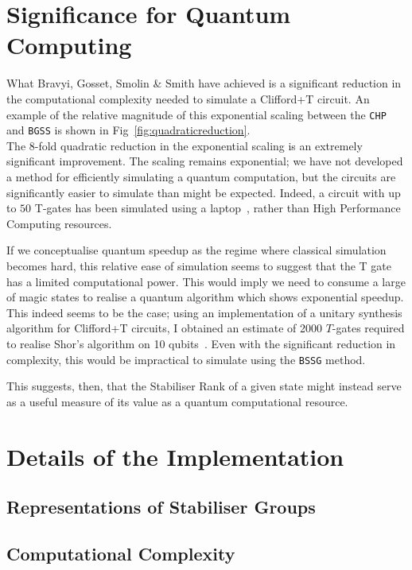 \documentclass{standalone}
\begin{document}
\section{Significance for Quantum Computing}\label{sec:whybgss}
What Bravyi, Gosset, Smolin \& Smith have achieved is a significant reduction in the computational complexity needed to simulate a Clifford+T circuit. An example of the relative magnitude of this exponential scaling between the \texttt{CHP} and \texttt{BGSS} is shown in Fig~\ref{fig:quadraticreduction}. \\
The 8-fold quadratic reduction in the exponential scaling is an extremely significant improvement. The scaling remains exponential; we have not developed a method for efficiently simulating a quantum computation, but the circuits are significantly easier to simulate than might be expected. Indeed, a circuit with up to $50$ T-gates has been simulated using a laptop~\cite{Bravyi2015}, rather than High Performance Computing resources. 
\par
If we conceptualise quantum speedup as the regime where classical simulation becomes hard, this relative ease of simulation seems to suggest that the T gate has a limited computational power. This would imply we need to consume a large of magic states to realise a quantum algorithm which shows exponential speedup.\\
This indeed seems to be the case; using an implementation of a unitary synthesis algorithm for Clifford+T circuits, I obtained an estimate of 2000 $T$-gates required to realise Shor's algorithm on 10 qubits~\cite{Selinger2012}. Even with the significant reduction in complexity, this would be impractical to simulate using the \texttt{BSSG} method. 
\par
This suggests, then, that the Stabiliser Rank of a given state might instead serve as a useful measure of its value as a quantum computational resource. 

\section{Details of the Implementation}
\subsection{Representations of Stabiliser Groups}
\subsection{Computational Complexity}
\ifstandalone

\fi
\end{document}
